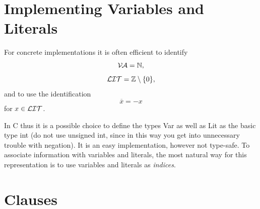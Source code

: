 \documentclass[12pt]{book}
\begin{document}
\section{Implementing Variables and Literals}
\label{sec:varlit}
For concrete implementations it is often efficient to identify
$$\mathcal{V\hspace{-0.1em}A} = \mathbb{N},$$
$$\mathcal{LIT} = \mathbb{Z}\setminus \{0\},$$ 
and to use the identification
$$\overline{x} = -x$$
for $x \in \mathcal{LIT}$.

In C thus it is a possible choice to define the types Var as well as Lit as the basic type int (do not use unsigned int, since in this 
way you get into unnecessary trouble with negation). It is an easy implementation, however not type-safe.
To associate information with variables and literals, the most natural way for this representation is to use variables and literals as 
\textit{indices}.
\section{Clauses}
\label{sec:Clauses}
\end{document}
